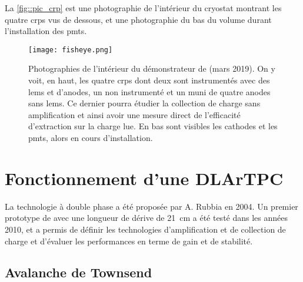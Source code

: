       La \autoref{fig::pic_crp} est une photographie de l'intérieur du cryostat montrant les quatre \glspl{crp} vus de dessous, et une photographie du bas du volume durant l'installation des \glspl{pmt}.

      \begin{figure}[htbp]
        \begin{center}\texttt{[image: fisheye.png]}\end{center}
        \caption[Photographie de l'intétrieur du démonstrateur de \SSS{}.]{\label{fig::pic_crp}Photographies de l'intérieur du démonstrateur de \SSS{} (mars 2019). On y voit, en haut, les quatre \glspl{crp} dont deux sont instrumentés avec des \glspl{lem} et d'anodes, un non instrumenté et un muni de quatre anodes sans \glspl{lem}. Ce dernier pourra étudier la collection de charge sans amplification et ainsi avoir une mesure direct de l'efficacité d'extraction sur la charge lue. En bas sont visibles les cathodes et les \glspl{pmt}, alors en cours d'installation.}
      \end{figure}

  \section{Fonctionnement d'une DLArTPC}\label{sec::dlartpc}
 
      La technologie à double phase a été proposée par A. Rubbia\cite{Rubbia2004} en 2004. Un premier prototype de \threeL{} avec une longueur de dérive de \SI{21}{\centi\meter} a été testé dans les années 2010, et a permis de définir les technologies d'amplification et de collection de charge\cite{Cantini2013} et d'évaluer les performances en terme de gain et de stabilité\cite{Cantini2014}.

    \subsection{Avalanche de Townsend}\label{sec::townsend}
      
